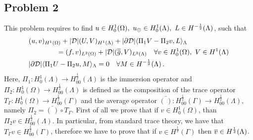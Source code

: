 \subsection{Problem 2}
This problem requires to find $u \in H^1_0(\Omega),\ u_{\odot} \in H^1_0(\Lambda), \ L \in H^{-\frac12}(\Lambda)$, such that
\begin{subequations}\label{eq:red_dirneu}
\begin{align}
&(u,v)_{H^1(\Omega)} + |{\cal D}|(U,V)_{H^1(\Lambda)} 
+ |\partial {\cal D}| \langle  \Pi_1 V - \Pi_2 v, L \rangle_\Lambda 
\\
\nonumber
&\qquad\qquad= (f,v)_{L^2(\Omega)} + |{\cal D}| (\avrd{g},V)_{L^2(\Lambda)}
\quad \forall v \in H^1_0(\Omega), \ V \in H^1(\Lambda)
\\
&  |\partial {\cal D}| \langle \Pi_1 U - \Pi_2 u, M \rangle_\Lambda = 0
\quad \forall M \in H^{-\frac12}(\Lambda)\,.
\end{align}
\end{subequations}
Here, $\Pi_1: H^1_0(\Lambda)\rightarrow H^{\frac 12}_{00}(\Lambda)$ is the immersion operator and $\Pi_2: H^1_0(\Omega)\rightarrow H^{\frac 12}_{00}(\Lambda)$ is defined as the composition of the trace operator $T_{\Gamma}: H^1_0(\Omega) \rightarrow H^{\frac 12}_{00}(\Gamma)$ and the average operator $\bar{(\,)}:H^{\frac 12}_{00}(\Gamma) \rightarrow H^{\frac 12}_{00}(\Lambda)$, namely $\Pi_2= \bar{(\,)}\circ T_{\Gamma}$. 
First of all we prove that if $v\in H^1_0(\Omega)$, than $\Pi _2 v \in H^{\frac 12}_{00}(\Lambda)$. In particular, from standard trace theory, we have that $T_{\Gamma} v\in H^{\frac 12}_{00}(\Gamma)$, therefore we have to prove that if $v \in H^{\frac 12 }(\Gamma)$ then $\overline{v}\in H^{\frac 12}(\Lambda)$. 

